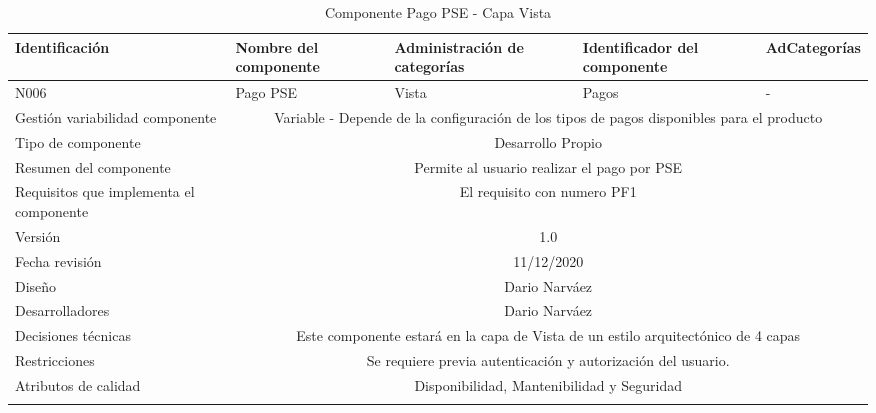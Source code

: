\documentclass[10pt,a4paper,openany]{book}
\begin{document}
\begin{longtable}{|p{3cm}|p{3cm}|p{3cm}|p{3cm}|p{3cm}|} \hline
Identificación & Nombre del componente & Administración de categorías & Identificador del componente & AdCategorías \\[0.5ex] \hline
N006& Pago PSE& Vista& Pagos& -\\[0.5ex] \hline
Gestión variabilidad componente & \multicolumn{4}{|c|}{{Variable - Depende de la configuración de los tipos de pagos disponibles para el producto}} \\ \hline
Tipo de componente & \multicolumn{4}{|c|}{Desarrollo Propio} \\ \hline
Resumen del componente & \multicolumn{4}{|c|}{Permite al usuario realizar el pago por PSE} \\ \hline
Requisitos que implementa el componente & \multicolumn{4}{|c|}{El requisito con numero PF1 } \\ \hline
Versión & \multicolumn{4}{|c|}{1.0 } \\ \hline
Fecha revisión & \multicolumn{4}{|c|}{ 11/12/2020} \\ \hline
Diseño & \multicolumn{4}{|c|}{Dario Narváez} \\ \hline
Desarrolladores & \multicolumn{4}{|c|}{Dario Narváez} \\ \hline
Decisiones técnicas & \multicolumn{4}{|c|}{Este componente estará en la capa de Vista de un estilo arquitectónico de 4 capas  } \\ \hline
Restricciones & \multicolumn{4}{|c|}{Se requiere previa autenticación y autorización del usuario.} \\ \hline
Atributos de calidad & \multicolumn{4}{|c|}{Disponibilidad, Mantenibilidad y Seguridad} \\ \hline
\caption{Componente Pago PSE - Capa Vista}
\label{table:t6}
\end{longtable}
\end{document}

